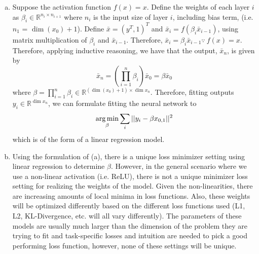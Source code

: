 \newcommand{\barx}{\bar{x}}
\begin{enumerate}[(a) ]
    \item Suppose the activation function $f(x) = x$. Define the weights of each layer $i$ as $\beta_i \in \mathbb{R}^{n_i \times n_{i+1}}$ where $n_i$ is the input size of layer $i$, including bias term, (i.e. $n_1$ = $\dim(x_0) + 1$). Define $\barx = (y^T, 1)^T$ and $\barx_i = f(\beta_i \barx_{i-1})$, using matrix multiplication of $\beta_i$ and $\barx_{i-1}$. Therefore, $\barx_i = \beta_i \barx_{i-1} \because ~f(x) = x$. Therefore, applying inductive reasoning, we have that the output, $\barx_n$, is given by
    $$
        \barx_n = \left(\prod_{i=1}^n \beta_i\right) \barx_0  = \beta \barx_0
    $$
    where $\beta = \prod_{i=1}^n \beta_i \in \mathbb{R}^{(\dim(x_0)+1) \times \dim{x_n} }$. Therefore, fitting outputs $y_i \in \mathbb{R}^{\dim{x_n}}$, we can formulate fitting the neural network to 
    $$
        \operatorname*{arg\,min}_\beta \sum_i ||y_i - \beta x_{0,1} ||^2
    $$
    which is of the form of a linear regression model.
    
    \item Using the formulation of (a), there is a unique loss minimizer setting using linear regression to determine $\beta$. However, in the general scenario where we use a non-linear activation (i.e. ReLU), there is not a unique minimizer loss setting for realizing the weights of the model. Given the non-linearities, there are increasing amounts of local minima in loss functions. Also, these weights will be optimized differently based on the different loss functions used (L1, L2, KL-Divergence, etc. will all vary differently). The parameters of these models are usually much larger than the dimension of the problem they are trying to fit and task-specific losses and intuition are needed to pick a good performing loss function, however, none of these settings will be unique.  
\end{enumerate}